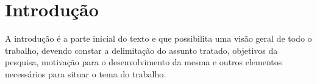 \documentclass[
	12pt,				%
	openright,			%
	oneside,
	a4paper,				%
	english,				%
	brazil				%
]{abntex2/abntex2} %
\begin{document}











\tableofcontents*
\cleardoublepage



\textual

\chapter{Introdução}

	A introdução é a parte inicial do texto e que possibilita uma visão geral de
todo o trabalho, devendo constar a delimitação do assunto tratado, objetivos
da pesquisa, motivação para o desenvolvimento da mesma e outros
elementos necessários para situar o tema do trabalho.
\end{document}
